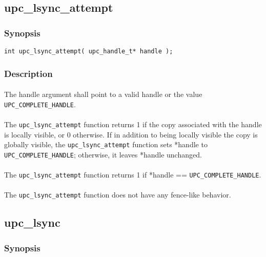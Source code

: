 \documentclass[10pt]{article}
\def \complete {{\tt UPC\_COMPLETE\_HANDLE}}
\begin{document}
\newpage
\subsection{upc\_lsync\_attempt}
\def\function{{\tt upc\_lsync\_attempt}}

\subsubsection{Synopsis}

\begin{verbatim}
int upc_lsync_attempt( upc_handle_t* handle ); 
\end{verbatim}

\subsubsection{Description}

\paragraph{} The handle argument shall point to a valid handle or the value
\complete{}.

\paragraph{} The \function{} function returns 1 if the copy associated with the
handle is locally visible, or 0 otherwise.  If in addition to being locally
visible the copy is globally visible, the \function{} function sets *handle to
\complete{}; otherwise, it leaves *handle unchanged.

\paragraph{} The \function{} function returns 1 if *handle == \complete{}.

\paragraph{} The \function{} function does not have any fence-like behavior.

\subsection{upc\_lsync}
\def\function{{\tt upc\_lsync}}

\subsubsection{Synopsis}
\end{document}
